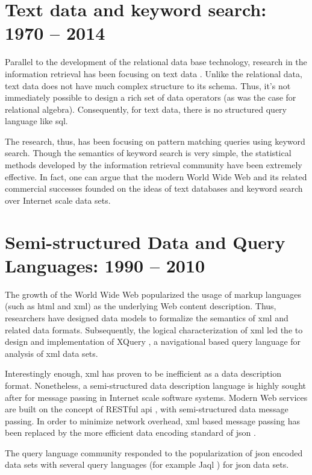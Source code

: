 	\section{Text data and keyword search:  1970 -- 2014}
		Parallel to the development of the relational data base technology, research in the information retrieval has been focusing on text data \cite{salton-88, jones-72}.  Unlike the relational data, text data does not have much complex structure to its schema.  Thus, it's not immediately possible to design a rich set of data operators (as was the case for relational algebra).  Consequently, for text data, there is no structured query language like \gls{sql}.
		
		The research, thus, has been focusing on pattern matching queries using keyword search.  Though the semantics of keyword search is very simple, the statistical methods developed by the information retrieval community \cite{salton-88, robertson-09, dumais-88} have been extremely effective.  In fact, one can argue that the modern World Wide Web and its related commercial successes founded on the ideas of text databases and keyword search over Internet scale data sets.
		
	\section{Semi-structured Data and Query Languages:  1990 -- 2010}
		The growth of the World Wide Web popularized the usage of markup languages (such as \gls{html} and \gls{xml}) as the underlying Web content description.  Thus, researchers have designed data models \cite{suciu-98} to formalize the semantics of \gls{xml} and related data formats.  Subsequently, the logical characterization of \gls{xml} led the to design and implementation of XQuery \cite{xquery-10}, a navigational based query language for analysis of \gls{xml} data sets.
		
		Interestingly enough, \gls{xml} has proven to be inefficient as a data description format.  Nonetheless, a semi-structured data description language is highly sought after for message passing in Internet scale software systems.  Modern Web services are built on the concept of RESTful \gls{api} \cite{restful-11}, with semi-structured data message passing.  In order to minimize network overhead, \gls{xml} based message passing has been replaced by the more efficient data encoding standard of \gls{json} \cite{json}.
		
		The query language community responded to the popularization of \gls{json} encoded data sets with several query languages \cite{simeon-13} (for example Jaql \cite{ibm-jaql}) for \gls{json} data sets.
	
